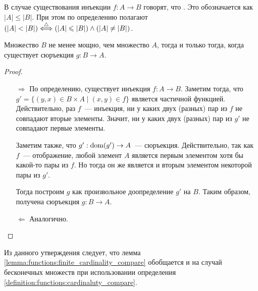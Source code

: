 \begin{definition}
    \label{definition:functions:cardinaluty_compare}
    В случае существования инъекции $ f: A \to B $ говорят, что .
    Это обозначается как $ |A| \leqslant |B| $.
    При этом по определению полагают $ (|A| < |B|) \overset{\triangle}{\Longleftrightarrow} (|A| \leqslant |B|) \wedge (|A| \neq |B|) $.
\end{definition}


\begin{statement}
    \label{statement:functions:cardinality_compare_equivalence}
    Множество $ B $ не менее мощно, чем множество $ A $, тогда и только тогда, когда существует сюръекция $ g: B \to A $.
\end{statement}

\begin{proof}
    \begin{enumerate}
        \item[]
        \item[$\Rightarrow$]
            По определению, существует инъекция $ f: A \to B $.
            Заметим тогда, что $ g' = \{ (y, x) \in B \times A \mid (x, y) \in f \} $ является частичной функцией.
            Действительно, раз $ f $~--- инъекция, ни у каких двух (разных) пар из $ f $ не совпадают вторые элементы.
            Значит, ни у каких двух (разных) пар из $ g' $ не совпадают первые элементы.

            Заметим также, что $ g': \operatorname*{\textnormal{dom}}(g') \to A $~--- сюръекция.
            Действительно, так как $ f $~--- отображение, любой элемент $ A $ является первым элементом хотя бы какой-то пары из $ f $.
            Но тогда он же является и вторым элементом некоторой пары из $ g' $.

            Тогда построим $ g $ как произвольное доопределение $ g' $ на $ B $.
            Таким образом, получена сюръекция $ g: B \to A $.
        \item[$\Leftarrow$]
            Аналогично.
    \end{enumerate}
\end{proof}

Из данного утверждения следует, что лемма \ref{lemma:functions:finite_cardinality_compare}
обобщается и на случай бесконечных множеств при использовании определения \ref{definition:functions:cardinaluty_compare}.
